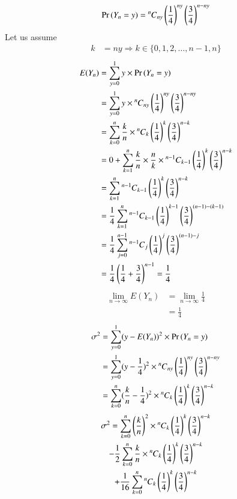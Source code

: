 \documentclass[journal,12pt,twocolumn]{IEEEtran}
\begin{document}
\begin{align}
    \Pr{(Y_n = y)} = \comb[n]{ny} \brak{\frac{1}{4}}^{ny} \brak{\frac{3}{4}}^{n-ny}
\end{align}
Let us assume
\begin{align}
    k &= ny\Rightarrow k \in \{0,1,2,\hdots,n-1,n\}
\end{align}
\begin{align}
    E(Y_n) &= \sum_{y=0}^{1}y\times  \Pr{(Y_n = y)}
    \\&= \sum_{y=0}^{1}y\times \comb[n]{ny}\brak{\frac{1}{4}}^{ny} \brak{\frac{3}{4}}^{n-ny}
    \\&= \sum_{k=0}^{n} \frac{k}{n}\times\comb[n]{k}\brak{\frac{1}{4}}^{k} \brak{\frac{3}{4}}^{n-k}
    \\&= 0 + \sum_{k=1}^{n} \frac{k}{n}\times\frac{n}{k}\times\comb[n-1]{k-1}\brak{\frac{1}{4}}^{k} \brak{\frac{3}{4}}^{n-k}
    \\&= \sum_{k=1}^{n} \comb[n-1]{k-1}\brak{\frac{1}{4}}^{k} \brak{\frac{3}{4}}^{n-k}
    \\&= \frac{1}{4} \sum_{k=1}^{n} \comb[n-1]{k-1}\brak{\frac{1}{4}}^{k-1} \brak{\frac{3}{4}}^{(n-1)-(k-1)}
    \\&= \frac{1}{4} \sum_{j=0}^{n-1} \comb[n-1]{j}\brak{\frac{1}{4}}^{j} \brak{\frac{3}{4}}^{(n-1)-j}
    \\&= \frac{1}{4} \brak{\frac{1}{4} + \frac{3}{4}}^{n-1} = \frac{1}{4}
\end{align}
\begin{align}
    \lim_{n\rightarrow \infty} E(Y_n) &= \lim_{n\rightarrow \infty} \frac{1}{4} 
    \\&= \frac{1}{4}
\end{align}
\begin{align}
    \sigma ^{2} &= \sum_{y=0}^{1} (y - E(Y_n))^2 \times \Pr{(Y_n = y)}
    \\&= \sum_{y=0}^{1} (y - \frac{1}{4})^2 \times  \comb[n]{ny}\brak{\frac{1}{4}}^{ny} \brak{\frac{3}{4}}^{n-ny}
    \\&= \sum_{k=0}^{n} (\frac{k}{n}- \frac{1}{4})^2 \times  \comb[n]{k}\brak{\frac{1}{4}}^{k} \brak{\frac{3}{4}}^{n-k}
\end{align}
\begin{multline}
     \sigma ^{2} = \sum_{k=0}^{n} \brak{\frac{k}{n}}^2 \times  \comb[n]{k}\brak{\frac{1}{4}}^{k} \brak{\frac{3}{4}}^{n-k}
     \\ - \frac{1}{2}\sum_{k=0}^{n} \frac{k}{n}\times\comb[n]{k}\brak{\frac{1}{4}}^{k} \brak{\frac{3}{4}}^{n-k}
     \\ + \frac{1}{16} \sum_{k=0}^{n} \comb[n]{k}\brak{\frac{1}{4}}^{k} \brak{\frac{3}{4}}^{n-k}
\end{multline}
\end{document}
